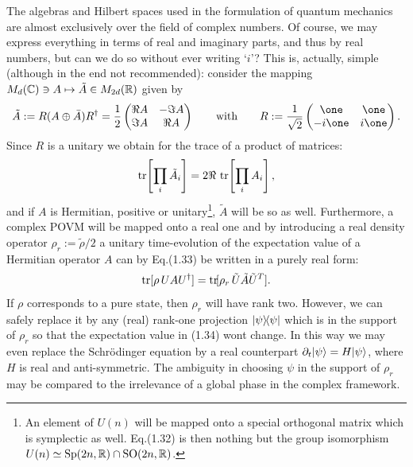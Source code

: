 \documentclass[11pt,a4paper]{article}
\theoremstyle{plain}
\theoremstyle{definition}
\theoremstyle{remark}
\numberwithin{equation}{section}
\begin{document}
The algebras and Hilbert spaces used in the formulation of quantum mechanics are almost exclusively over the field of complex numbers. Of course, we may express everything in terms of real and imaginary parts, and thus by real numbers, but can we do so without ever writing `$i$'? This is, actually, simple (although in the end not recommended): consider the mapping $M_d(\mathbb{C})\ni A\mapsto \tilde{A}\in M_{2d}(\mathbb{R})$ given by
\begin{equation}
    \tilde{A} := R(A\oplus \bar{A})R^\dagger
    =\frac12
    \begin{pmatrix}
        \Re A &-\Im A\\
        \Im A &\Re A
    \end{pmatrix}
    \qquad\text{with}\qquad
    R:=\frac{1}{\sqrt{2}}
    \begin{pmatrix}
        \one   &\one\\
        -i\one &i\one
    \end{pmatrix}.
\end{equation}
Since $R$ is a unitary we obtain for the trace of a product of matrices:
\begin{equation}
    \operatorname{tr}\!\left[\prod_i \tilde{A}_i\right]
    = 2\Re\, \operatorname{tr}\!\left[\prod_i A_i\right],
\end{equation}
and if $A$ is Hermitian, positive or unitary\footnote{An element of $U(n)$ will be mapped onto a special orthogonal matrix which is symplectic as well. Eq.(1.32) is then nothing but the group isomorphism $U(n)\simeq \mathrm{Sp}(2n,\mathbb{R})\cap \mathrm{SO}(2n,\mathbb{R})$.}, $\tilde{A}$ will be so as well. Furthermore, a complex POVM will be mapped onto a real one and by introducing a real density operator $\rho_r:=\tilde{\rho}/2$ a unitary time-evolution of the expectation value of a Hermitian operator $A$ can by Eq.(1.33) be written in a purely real form:
\begin{equation}
    \operatorname{tr}[\rho\,UAU^\dagger] = \operatorname{tr}\![\rho_r\,\tilde{U}\tilde{A}\tilde{U}^{T}].
\end{equation}
If $\rho$ corresponds to a pure state, then $\rho_r$ will have rank two. However, we can safely replace it by any (real) rank-one projection $|\psi\rangle\!\langle\psi|$ which is in the support of $\rho_r$ so that the expectation value in (1.34) wont change. In this way we may even replace the Schr\"odinger equation by a real counterpart $\partial_t|\psi\rangle=H|\psi\rangle$, where $H$ is real and anti-symmetric. The ambiguity in choosing $\psi$ in the support of $\rho_r$ may be compared to the irrelevance of a global phase in the complex framework.
\end{document}
